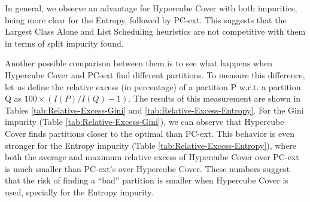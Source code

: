 
In general, we observe an advantage for Hypercube Cover with both impurities, being more clear for the Entropy, followed by PC-ext. This suggests that the Largest Class Alone and List Scheduling heuristics are not competitive with them in terms of split impurity found.

Another possible comparison between them is to see what happens when Hypercube Cover and PC-ext find different partitions. To measure this difference, let us define the relative excess (in percentage) of a partition P w.r.t. a partition Q as $100 \times (I(P)/I(Q) - 1)$. The results of this measurement are shown in Tables \ref{tab:Relative-Excess-Gini} and \ref{tab:Relative-Excess-Entropy}. For the Gini impurity (Table \ref{tab:Relative-Excess-Gini}), we can observe that Hypercube Cover finds partitions closer to the optimal than PC-ext. This behavior is even stronger for the Entropy impurity (Table \ref{tab:Relative-Excess-Entropy}), where both the average and maximum relative excess of Hypercube Cover over PC-ext is much smaller than PC-ext's over Hypercube Cover. These numbers suggest that the risk of finding a ``bad'' partition is smaller when Hypercube Cover is used, specially for the Entropy impurity.

